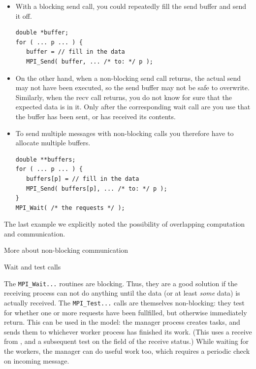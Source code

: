 \begin{itemize}
\item With a blocking send call, you could repeatedly fill the send
  buffer and send it off.
\begin{lstlisting}
double *buffer;
for ( ... p ... ) {
   buffer = // fill in the data
   MPI_Send( buffer, ... /* to: */ p );
\end{lstlisting}
\item On the other hand, when a non-blocking send call returns,
  the actual send may not have been executed,
  so the send buffer may not be safe to overwrite.
  Similarly, when the recv call returns, you do not know for sure that
  the expected data is in it. Only after the corresponding wait call
  are you use that the buffer has been sent, or has received its contents.
\item 
  To send multiple messages with non-blocking calls
  you therefore have to allocate multiple buffers.
\begin{lstlisting}
double **buffers;
for ( ... p ... ) {
   buffers[p] = // fill in the data
   MPI_Send( buffers[p], ... /* to: */ p );
}
MPI_Wait( /* the requests */ );
\end{lstlisting}
\end{itemize}


The last example we explicitly noted the possibility of
overlapping computation and communication.

 {More about non-blocking communication}

 {Wait and test calls}
\label{sec:mpitest}
\label{sec:mpi-test}

The \lstinline{MPI_Wait...} routines are blocking. Thus, they are a good solution if 
the receiving process can not do anything until the data 
(or at least \emph{some} data) is actually received.
The \lstinline{MPI_Test...} calls are themselves non-blocking: they
test for whether one or more requests have been
fullfilled, but otherwise immediately return.
This can be used in the
 model: the manager process creates tasks, and
sends them to whichever worker process has finished its work.
(This uses a receive from , and a
subsequent test on the  field of the receive status.)
While waiting for the workers, the manager can do useful work too,
which requires a periodic check on incoming message.

